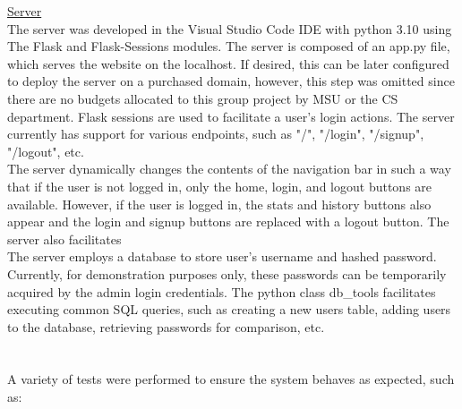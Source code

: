 \documentclass[12pt]{article}
\begin{document}
\noindent \underline{Server}
\\The server was developed in the Visual Studio Code IDE with python 3.10 using The Flask and Flask-Sessions modules. The server is composed of an app.py file, which serves the website on the localhost. If desired, this can be later configured to deploy the server on a purchased domain, however, this step was omitted since there are no budgets allocated to this group project by MSU or the CS department. Flask sessions are used to facilitate a user's login actions. The server currently has support for various endpoints, such as "/", "/login", "/signup", "/logout", etc.
\\The server dynamically changes the contents of the navigation bar in such a way that if the user is not logged in, only the home, login, and logout buttons are available. However, if the user is logged in, the stats and history buttons also appear and the login and signup buttons are replaced with a logout button. The server also facilitates
\\The server employs a database to store user's username and hashed password. Currently, for demonstration purposes only, these passwords can be temporarily acquired by the admin login credentials. The python class db\_tools facilitates executing common SQL queries, such as creating a new users table, adding users to the database, retrieving passwords for comparison, etc.\\\\\\
A variety of tests were performed to ensure the system behaves as expected, such as:
\end{document}
